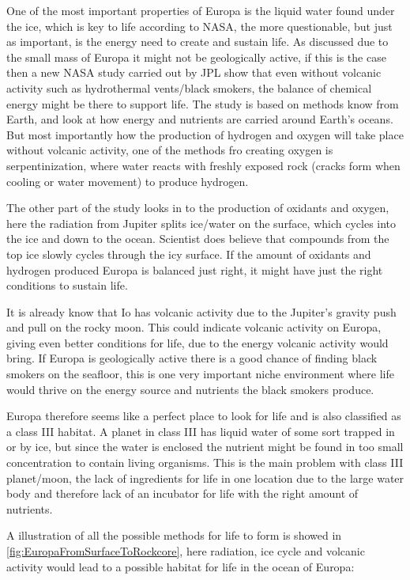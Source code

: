 One of the most important properties of Europa is the liquid water found under the ice, which is key to life according to NASA, the more questionable, but just as important, is the energy need to create and sustain life. As discussed due to the small mass of Europa it might not be geologically active, if this is the case then a new NASA study carried out by JPL\cite{EuropasOceanLife} show that even without volcanic activity such as hydrothermal vents/black smokers, the balance of chemical energy might be there to support life. The study is based on methods know from Earth, and look at how energy and nutrients are carried around Earth's oceans. But most importantly how the production of hydrogen and oxygen will take place without volcanic activity, one of the methods fro creating oxygen is serpentinization, where water reacts with freshly exposed rock (cracks form when cooling or water movement) to produce hydrogen.

The other part of the study looks in to the production of oxidants and oxygen, here the radiation from Jupiter splits ice/water on the surface, which cycles into the ice and down to the ocean. Scientist does believe that compounds from the top ice slowly cycles through the icy surface. If the amount of oxidants and hydrogen produced Europa is balanced just right, it might have just the right conditions to sustain life.

It is already know that Io has volcanic activity due to the Jupiter's gravity push and pull on the rocky moon. This could indicate volcanic activity on Europa, giving even better conditions for life, due to the energy volcanic activity would bring. If Europa is geologically active there is a good chance of finding black smokers on the seafloor, this is one very important niche environment where life would thrive on the energy source and nutrients the black smokers produce.

Europa therefore seems like a perfect place to look for life and is also classified as a class III habitat. A planet in class III has liquid water of some sort trapped in or by ice, but since the water is enclosed the nutrient might be found in too small concentration to contain living organisms. This is the main problem with class III planet/moon, the lack of ingredients for life in one location due to the large water body and therefore lack of an incubator for life with the right amount of nutrients.

A illustration of all the possible methods for life to form is showed in \ref{fig:EuropaFromSurfaceToRockcore}, here radiation, ice cycle and volcanic activity would lead to a possible habitat for life in the ocean of Europa:

